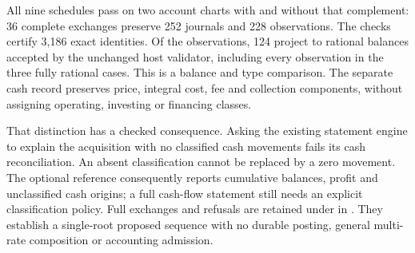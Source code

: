 All nine schedules pass on two account charts with and without that complement:
36 complete exchanges preserve 252 journals and 228 observations. The checks
certify 3,186 exact identities. Of the observations, 124 project to rational
balances accepted by the unchanged host validator, including every observation
in the three fully rational cases. This is a balance and type comparison.
The separate cash record preserves price, integral cost, fee and collection
components, without assigning operating, investing or financing classes.

That distinction has a checked consequence. Asking the existing statement
engine to explain the acquisition with no classified cash movements fails its
cash reconciliation. An absent classification cannot be replaced by a zero
movement. The optional reference consequently reports cumulative balances,
profit and unclassified cash origins; a full cash-flow statement still needs
an explicit classification policy. Full exchanges and refusals are retained
under {\small{}} in
{\small{}}. They establish a single-root
proposed sequence with no durable posting, general multi-rate composition or
accounting admission.

